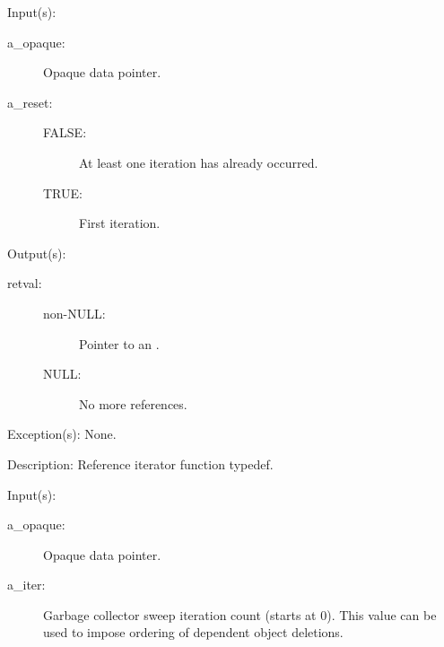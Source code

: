 \begin{capi}
\label{cw_nxo_class_ref_iter_t}
	\begin{capilist}
	\item[Input(s): ]
		\begin{description}\item[]
		\item[a\_opaque: ]
			Opaque data pointer.
		\item[a\_reset: ]
			\begin{description}\item[]
			\item[FALSE: ]
				At least one iteration has already occurred.
			\item[TRUE: ]
				First iteration.
			\end{description}
		\end{description}
	\item[Output(s): ]
		\begin{description}\item[]
		\item[retval: ]
			\begin{description}\item[]
			\item[non-NULL: ]
				Pointer to an .
			\item[NULL: ]
				No more references.
			\end{description}
		\end{description}
	\item[Exception(s): ] None.
	\item[Description: ]
		Reference iterator function typedef.
	\end{capilist}
\label{cw_nxo_class_delete_t}
	\begin{capilist}
	\item[Input(s): ]
		\begin{description}\item[]
		\item[a\_opaque: ]
			Opaque data pointer.
		\item[a\_iter: ]
			Garbage collector sweep iteration count (starts at 0).
			This value can be used to impose ordering of dependent
			object deletions.

\end{description}
\end{capilist}
\end{capi}
